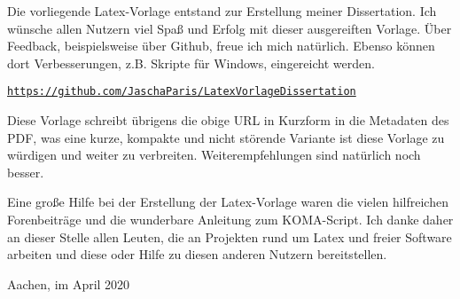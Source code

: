 
Die vorliegende Latex-Vorlage entstand zur Erstellung meiner Dissertation. Ich wünsche allen Nutzern viel Spaß und Erfolg mit dieser ausgereiften Vorlage. Über Feedback, beispielsweise über Github, freue ich mich natürlich. Ebenso können dort Verbesserungen, z.B. Skripte für Windows, eingereicht werden.

\texttt{\url{https://github.com/JaschaParis/LatexVorlageDissertation}}

Diese Vorlage schreibt übrigens die obige URL in Kurzform in die Metadaten des PDF, was eine kurze, kompakte und nicht störende Variante ist diese Vorlage zu würdigen und weiter zu verbreiten. Weiterempfehlungen sind natürlich noch besser.

Eine große Hilfe bei der Erstellung der Latex-Vorlage waren die vielen hilfreichen Forenbeiträge und die wunderbare Anleitung zum \textsc{KOMA}-Script. Ich danke daher an dieser Stelle allen Leuten, die an Projekten rund um Latex und freier Software arbeiten und diese oder Hilfe zu diesen anderen Nutzern bereitstellen.

\vspace{5mm}
\par
\begingroup
\leftskip=1cm %
\noindent 
Aachen, im April 2020

\vspace{-5mm}
\leftskip=1cm %
\autor
\par
\endgroup
